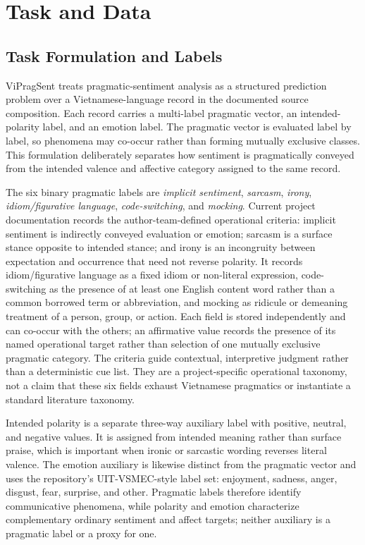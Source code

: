\section{Task and Data}
\label{sec:task-data}

\subsection{Task Formulation and Labels}

ViPragSent treats pragmatic-sentiment analysis as a structured prediction problem over a Vietnamese-language record in the documented source composition. Each record carries a multi-label pragmatic vector, an intended-polarity label, and an emotion label. The pragmatic vector is evaluated label by label, so phenomena may co-occur rather than forming mutually exclusive classes. This formulation deliberately separates how sentiment is pragmatically conveyed from the intended valence and affective category assigned to the same record.

The six binary pragmatic labels are \emph{implicit sentiment}, \emph{sarcasm}, \emph{irony}, \emph{idiom/figurative language}, \emph{code-switching}, and \emph{mocking}.
Current project documentation records the author-team-defined operational criteria: implicit sentiment is indirectly conveyed evaluation or emotion; sarcasm is a surface stance opposite to intended stance; and irony is an incongruity between expectation and occurrence that need not reverse polarity.  It records idiom/figurative language as a fixed idiom or non-literal expression, code-switching as the presence of at least one English content word rather than a common borrowed term or abbreviation, and mocking as ridicule or demeaning treatment of a person, group, or action.  Each field is stored independently and can co-occur with the others; an affirmative value records the presence of its named operational target rather than selection of one mutually exclusive pragmatic category.  The criteria guide contextual, interpretive judgment rather than a deterministic cue list.  They are a project-specific operational taxonomy, not a claim that these six fields exhaust Vietnamese pragmatics or instantiate a standard literature taxonomy.

Intended polarity is a separate three-way auxiliary label with positive, neutral, and negative values.
It is assigned from intended meaning rather than surface praise, which is important when ironic or sarcastic wording reverses literal valence. The emotion auxiliary is likewise distinct from the pragmatic vector and uses the repository's UIT-VSMEC-style label set: enjoyment, sadness, anger, disgust, fear, surprise, and other. Pragmatic labels therefore identify communicative phenomena, while polarity and emotion characterize complementary ordinary sentiment and affect targets; neither auxiliary is a pragmatic label or a proxy for one.

